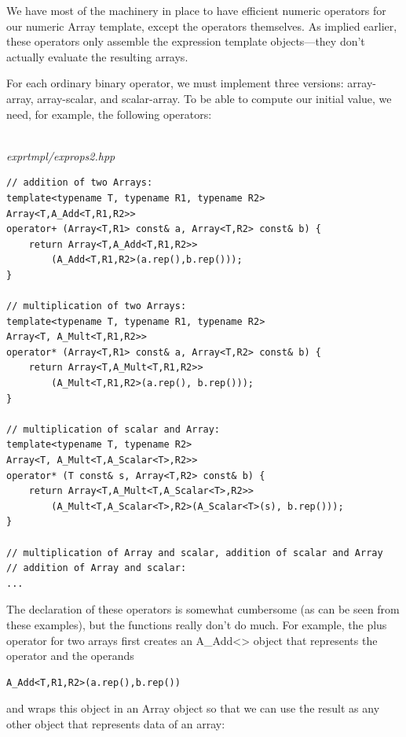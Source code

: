 
We have most of the machinery in place to have efficient numeric operators for our numeric Array template, except the operators themselves. As implied earlier, these operators only assemble the expression template objects—they don’t actually evaluate the resulting arrays.

For each ordinary binary operator, we must implement three versions: array-array, array-scalar, and scalar-array. To be able to compute our initial value, we need, for example, the following operators:

\hspace*{\fill} \\ %
\noindent
\textit{exprtmpl/exprops2.hpp}
\begin{lstlisting}[style=styleCXX]
// addition of two Arrays:
template<typename T, typename R1, typename R2>
Array<T,A_Add<T,R1,R2>>
operator+ (Array<T,R1> const& a, Array<T,R2> const& b) {
	return Array<T,A_Add<T,R1,R2>>
		(A_Add<T,R1,R2>(a.rep(),b.rep()));
}

// multiplication of two Arrays:
template<typename T, typename R1, typename R2>
Array<T, A_Mult<T,R1,R2>>
operator* (Array<T,R1> const& a, Array<T,R2> const& b) {
	return Array<T,A_Mult<T,R1,R2>>
		(A_Mult<T,R1,R2>(a.rep(), b.rep()));
}

// multiplication of scalar and Array:
template<typename T, typename R2>
Array<T, A_Mult<T,A_Scalar<T>,R2>>
operator* (T const& s, Array<T,R2> const& b) {
	return Array<T,A_Mult<T,A_Scalar<T>,R2>>
		(A_Mult<T,A_Scalar<T>,R2>(A_Scalar<T>(s), b.rep()));
}

// multiplication of Array and scalar, addition of scalar and Array
// addition of Array and scalar:
...
\end{lstlisting}

The declaration of these operators is somewhat cumbersome (as can be seen from these examples), but the functions really don’t do much. For example, the plus operator for two arrays first creates an A\_Add<> object that represents the operator and the operands

\begin{lstlisting}[style=styleCXX]
A_Add<T,R1,R2>(a.rep(),b.rep())
\end{lstlisting}

and wraps this object in an Array object so that we can use the result as any other object that represents data of an array:

